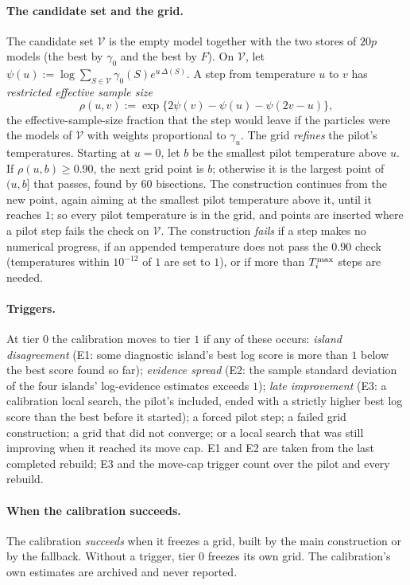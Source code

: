 \paragraph{The candidate set and the grid.} The candidate set $\mathcal V$ is the empty model together with the two stores
of $20p$ models (the best by $\gamma_0$ and the best by $F$). On $\mathcal V$, let
$\psi(u):=\log\sum_{S\in\mathcal V}\gamma_0(S)e^{u\,\Delta(S)}$. A step from temperature $u$ to $v$ has \emph{restricted effective
sample size}
\[
  \rho(u,v):=\exp\{2\psi(v)-\psi(u)-\psi(2v-u)\},
\]
the effective-sample-size fraction that the step would leave if the particles were the models of $\mathcal V$ with
weights proportional to $\gamma_u$. The grid \emph{refines} the pilot's temperatures. Starting at $u=0$, let $b$ be the
smallest pilot temperature above $u$. If $\rho(u,b)\ge0.90$, the next grid point is $b$; otherwise it is the largest
point of $(u,b]$ that passes, found by 60 bisections. The construction continues from the new point, again aiming at the
smallest pilot temperature above it, until it reaches $1$; so every pilot temperature is in the grid, and points are
inserted where a pilot step fails the check on $\mathcal V$. The construction \emph{fails} if a step
makes no numerical progress, if an appended temperature does not pass the $0.90$ check (temperatures within $10^{-12}$ of
$1$ are set to $1$), or if more than $T^{\max}_i$ steps are needed.

\paragraph{Triggers.} At tier $0$ the calibration moves to tier $1$ if any of these occurs: \emph{island disagreement}
(E1: some diagnostic island's best log score is more than $1$ below the best score found so far); \emph{evidence
spread} (E2: the sample standard deviation of the four islands' log-evidence estimates exceeds $1$); \emph{late
improvement} (E3: a calibration local search, the pilot's included, ended with a strictly higher best log score than the
best before it started); a forced pilot step; a failed grid construction; a grid
that did not converge; or a local search that was still improving when it reached its move cap. E1 and E2 are taken from
the last completed rebuild; E3 and the move-cap trigger count over the pilot and every rebuild.

\paragraph{When the calibration succeeds.} The calibration \emph{succeeds} when it freezes a grid, built by the main
construction or by the fallback. Without a trigger, tier $0$ freezes its own grid. The calibration's own estimates are
archived and never reported.


